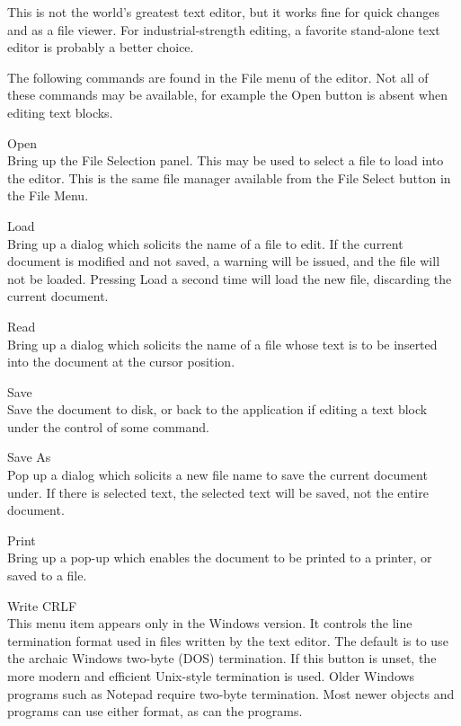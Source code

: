 This is not the world's greatest text editor, but it
works fine for quick changes and as a file viewer.  For
industrial-strength editing, a favorite stand-alone text editor is
probably a better choice. 

The following commands are found in the {\cb File} menu of the
editor.  Not all of these commands may be available, for example the
{\cb Open} button is absent when editing text blocks.

\begin{description}
\item{\cb Open}\\
Bring up the {\cb File Selection} panel.  This may be used to select a
file to load into the editor.  This is the same file manager available
from the {\cb File Select} button in the {\Xic} {\cb File Menu}.

\item{\cb Load}\\
Bring up a dialog which solicits the name of a file to edit.  If the
current document is modified and not saved, a warning will be issued,
and the file will not be loaded.  Pressing {\cb Load} a second time
will load the new file, discarding the current document.

\item{\cb Read}\\
Bring up a dialog which solicits the name of a file whose text is to
be inserted into the document at the cursor position.

\item{\cb Save}\\
Save the document to disk, or back to the application if editing a
text block under the control of some command.

\item{\cb Save As}\\
Pop up a dialog which solicits a new file name to save the current
document under.  If there is selected text, the selected text will be
saved, not the entire document.

\item{\cb Print}\\
Bring up a pop-up which enables the document to be printed to a
printer, or saved to a file.

\item{\cb Write CRLF}\\
This menu item appears only in the Windows version.  It controls the
line termination format used in files written by the text editor.  The
default is to use the archaic Windows two-byte (DOS) termination.  If
this button is unset, the more modern and efficient Unix-style
termination is used.  Older Windows programs such as Notepad require
two-byte termination.  Most newer objects and programs can use either
format, as can the {\XicTools} programs.


\end{description}
